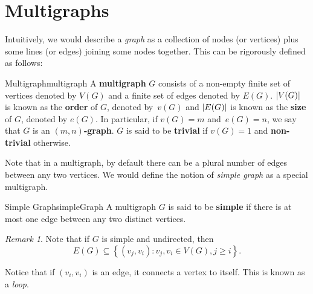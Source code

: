 \documentclass[math]{amznotes}
\theoremstyle{remark}
\newtheorem*{remark}{Remark}
\begin{document}
\section{Multigraphs}
Intuitively, we would describe a \textit{graph} as a collection of nodes (or vertices) plus some lines (or edges) joining some nodes together. This can be rigorously defined as follows:
\begin{dfnbox}{Multigraph}{multigraph}
    A {\color{red} \textbf{multigraph}} $G$ consists of a non-empty finite set of vertices denoted by $V(G)$ and a finite set of edges denoted by $E(G)$. ${\left\lvert {V(G)} \right\rvert}$ is known as the {\color{red} \textbf{order}} of $G$, denoted by~$v(G)$ and ${\left\lvert {E(G)} \right\rvert}$ is known as the {\color{red} \textbf{size}} of $G$, denoted by $e(G)$. In particular, if $v(G) = m$ and~$e(G) = n$, we say that $G$ is an {\color{red} \textbf{$(m, n)$-graph}}. $G$ is said to be {\color{red} \textbf{trivial}} if $v(G) = 1$ and {\color{red} \textbf{non-trivial}} otherwise.
\end{dfnbox}
Note that in a multigraph, by default there can be a plural number of edges between any two vertices. We would define the notion of \textit{simple graph} as a special multigraph.
\begin{dfnbox}{Simple Graph}{simpleGraph}
    A multigraph $G$ is said to be {\color{red} \textbf{simple}} if there is at most one edge between any two distinct vertices.
\end{dfnbox}
\begin{notebox}
    \begin{remark}
        Note that if $G$ is simple and undirected, then
        \begin{displaymath}
            E(G) \subseteq \left\{(v_j, v_i) \colon v_j, v_i \in V(G), j \geq i\right\}.
        \end{displaymath}
    \end{remark}
\end{notebox}
Notice that if $(v_i, v_i)$ is an edge, it connects a vertex to itself. This is known as a \textit{loop}.
\end{document}
